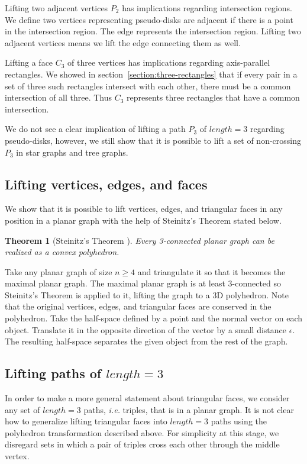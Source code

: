 \documentclass{NSF}
\newtheorem{theorem}{Theorem}[section]
\begin{document}
Lifting two adjacent vertices $P_2$ has implications regarding intersection regions. We define two vertices representing pseudo-disks are adjacent if there is a point in the intersection region. The edge represents the intersection region. Lifting two adjacent vertices means we lift the edge connecting them as well.

Lifting a face $C_3$ of three vertices has implications regarding axis-parallel rectangles. We showed in section~\ref{section:three-rectangles} that if every pair in a set of three such rectangles intersect with each other, there must be a common intersection of all three. Thus $C_3$ represents three rectangles that have a common intersection.

We do not see a clear implication of lifting a path $P_3$ of $length=3$ regarding pseudo-disks, however, we still show that it is possible to lift a set of non-crossing $P_3$ in star graphs and tree graphs.


\subsection{Lifting vertices, edges, and faces}

We show that it is possible to lift vertices, edges, and triangular faces in any position in a planar graph with the help of Steinitz's Theorem stated below. 

\begin{theorem}[Steinitz's Theorem \cite{weisstein}]
Every 3-connected planar graph can be realized as a convex polyhedron. 
\end{theorem}

Take any planar graph of size $n \geq 4$ and triangulate it so that it becomes the maximal planar graph. The maximal planar graph is at least 3-connected so Steinitz's Theorem is applied to it, lifting the graph to a 3D polyhedron. Note that the original vertices, edges, and triangular faces are conserved in the polyhedron. Take the half-space defined by a point and the normal vector on each object. Translate it in the opposite direction of the vector by a small distance $\epsilon$. The resulting half-space separates the given object from the rest of the graph.

\subsection{Lifting paths of \texorpdfstring{$length=3$}{length=3}}
In order to make a more general statement about triangular faces, we consider any set of $length=3$ paths, \textit{i.e.} triples, that is in a planar graph. It is not clear how to generalize lifting triangular faces into $length=3$ paths using the polyhedron transformation described above. For simplicity at this stage, we disregard sets in which a pair of triples cross each other through the middle vertex.
\end{document}
